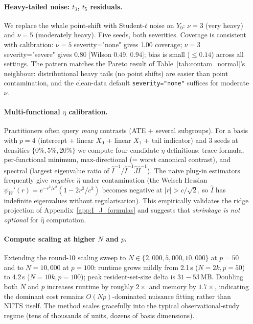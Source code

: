 \paragraph{Heavy-tailed noise: $t_3$, $t_5$ residuals.}
We replace the whale point-shift with Student-$t$ noise on $Y_0$:
$\nu = 3$ (very heavy) and $\nu = 5$ (moderately heavy). Five
seeds, both severities. Coverage is consistent with calibration:
$\nu = 5$ severity="none" gives 1.00 coverage; $\nu = 3$
severity="severe" gives 0.80 [Wilson 0.49, 0.94]; bias is small
($\le 0.14$) across all settings. The pattern matches the Pareto
result of Table~\ref{tab:contam_normal}'s neighbour: distributional
heavy tails (no point shifts) are easier than point contamination,
and the clean-data default \texttt{severity="none"} suffices for
moderate $\nu$.

\paragraph{Multi-functional $\eta$ calibration.}
Practitioners often query \emph{many} contrasts (ATE + several
subgroups). For a basis with $p = 4$ (intercept + linear $X_0$ +
linear $X_1$ + tail indicator) and 3 seeds at densities
$\{0\%, 5\%, 20\%\}$ we compute four candidate $\eta$ definitions:
trace formula, per-functional minimum, max-directional (= worst
canonical contrast), and spectral (largest eigenvalue ratio of
$\widehat I^{-1}/\widehat I^{-1} \widehat J \widehat I^{-1}$).
The naive plug-in estimators frequently give \emph{negative}
$\hat\eta$ under contamination (the Welsch Hessian
$\psi_W'(r) = e^{-r^2/c^2}(1 - 2r^2/c^2)$ becomes negative at
$|r| > c/\sqrt{2}$, so $\widehat I$ has indefinite eigenvalues
without regularisation). This empirically validates the ridge
projection of Appendix~\ref{app:I_J_formulas} and suggests that
\emph{shrinkage is not optional} for $\hat\eta$ computation.

\paragraph{Compute scaling at higher $N$ and $p$.}
Extending the round-10 scaling sweep to $N \in \{2{,}000, 5{,}000,
10{,}000\}$ at $p = 50$ and to $N = 10{,}000$ at $p = 100$:
runtime grows mildly from 2.1\,s ($N = 2k, p = 50$) to 4.2\,s
($N = 10k, p = 100$); peak resident-set-size delta is $31{-}53$\,MB.
Doubling both $N$ and $p$ increases runtime by roughly $2\times$ and
memory by $1.7\times$, indicating the dominant cost remains
$O(Np)$-dominated nuisance fitting rather than NUTS itself. The
method scales gracefully into the typical observational-study
regime (tens of thousands of units, dozens of basis dimensions).

